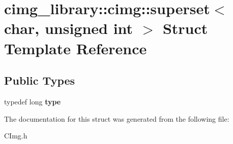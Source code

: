 \hypertarget{structcimg__library_1_1cimg_1_1superset_3_01char_00_01unsigned_01int_01_4}{\section{cimg\-\_\-library\-:\-:cimg\-:\-:superset$<$ char, unsigned int $>$ Struct Template Reference}
\label{structcimg__library_1_1cimg_1_1superset_3_01char_00_01unsigned_01int_01_4}
}
\subsection*{Public Types}
\begin{DoxyCompactItemize}
\item 
\hypertarget{structcimg__library_1_1cimg_1_1superset_3_01char_00_01unsigned_01int_01_4_aeb5982788085f90b049cae1987dc2092}{typedef long {\bfseries type}}\label{structcimg__library_1_1cimg_1_1superset_3_01char_00_01unsigned_01int_01_4_aeb5982788085f90b049cae1987dc2092}

\end{DoxyCompactItemize}


The documentation for this struct was generated from the following file\-:\begin{DoxyCompactItemize}
\item 
C\-Img.\-h\end{DoxyCompactItemize}
